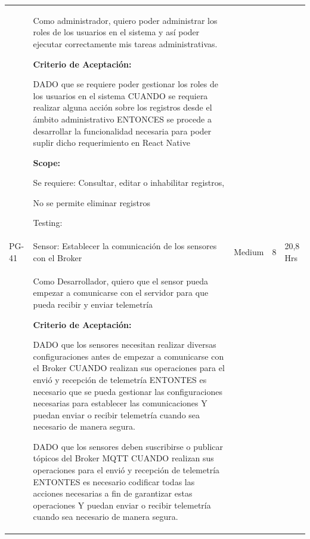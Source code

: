 \documentclass[11pt]{charter}
\begin{document}
\begin{landscape}
\begin{tabularx}{\linewidth}{@{}|p{1.3cm}|p{17cm}|p{1.7cm}|p{1.5cm}|p{1.7cm}|@{}}
         &  \begin{description}                 
                   \item Como administrador, quiero poder   administrar los roles de los usuarios en el sistema y así poder ejecutar   correctamente mis tareas administrativas.                 
                   \item \textbf{Criterio de Aceptación:}                 
                   \item DADO que se requiere poder gestionar los roles de los usuarios en el   sistema CUANDO se requiera realizar alguna acción sobre los registros desde el   ámbito administrativo ENTONCES se procede a desarrollar la funcionalidad necesaria para poder   suplir dicho requerimiento en React Native                
                   \item \textbf{Scope:}                  
                         \item Se requiere: Consultar, editar o inhabilitar registros, 
                         \item No se permite eliminar registros                 
                   \item Testing:
            \end{description}          &  &     & \\
PG-41    & Sensor: Establecer la   comunicación de los sensores con el Broker & Medium             & 8   & 20,8  Hrs         \\
         &  \begin{description}                 
                   \item Como Desarrollador, quiero que   el sensor pueda empezar a comunicarse con el servidor para que pueda recibir   y enviar telemetría                 
                   \item \textbf{Criterio de Aceptación:}                 
                   \item DADO que los sensores necesitan realizar diversas configuraciones antes de   empezar a comunicarse con el Broker CUANDO realizan sus operaciones para el envió y recepción de   telemetría ENTONTES es necesario que se pueda gestionar las configuraciones necesarias   para establecer las comunicaciones  Y puedan enviar o recibir telemetría cuando sea necesario de manera   segura.                 
                   \item DADO que los sensores deben suscribirse o publicar tópicos del Broker   MQTT CUANDO realizan sus operaciones para el envió y recepción de   telemetría ENTONTES es necesario codificar todas las acciones necesarias a fin de   garantizar estas operaciones Y puedan enviar o recibir telemetría cuando sea necesario de manera   segura.             

\end{description}
\end{tabularx}
\end{landscape}
\end{document}
